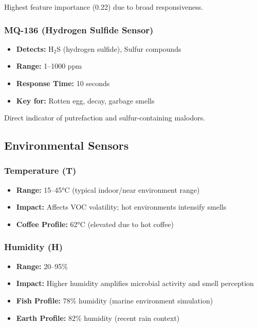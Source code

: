 \documentclass[10pt]{article}
\begin{document}
Highest feature importance (0.22) due to broad responsiveness.

\subsubsection{MQ-136 (Hydrogen Sulfide Sensor)}

\begin{itemize}
    \item \textbf{Detects:} H$_2$S (hydrogen sulfide), Sulfur compounds
    \item \textbf{Range:} 1–1000 ppm
    \item \textbf{Response Time:} 10 seconds
    \item \textbf{Key for:} Rotten egg, decay, garbage smells
\end{itemize}

Direct indicator of putrefaction and sulfur-containing malodors.

\subsection{Environmental Sensors}

\subsubsection{Temperature (T)}

\begin{itemize}
    \item \textbf{Range:} 15–45°C (typical indoor/near environment range)
    \item \textbf{Impact:} Affects VOC volatility; hot environments intensify smells
    \item \textbf{Coffee Profile:} 62°C (elevated due to hot coffee)
\end{itemize}

\subsubsection{Humidity (H)}

\begin{itemize}
    \item \textbf{Range:} 20–95\%
    \item \textbf{Impact:} Higher humidity amplifies microbial activity and smell perception
    \item \textbf{Fish Profile:} 78\% humidity (marine environment simulation)
    \item \textbf{Earth Profile:} 82\% humidity (recent rain context)
\end{itemize}
\end{document}
